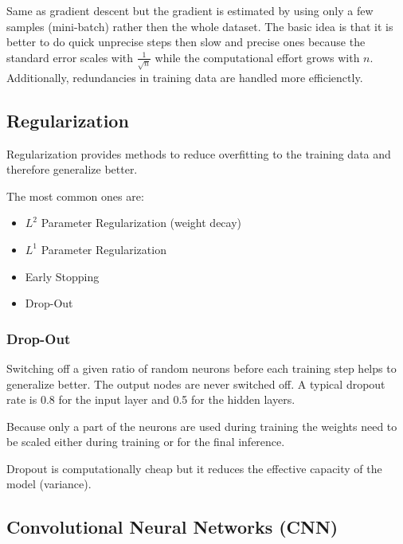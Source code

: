 Same as gradient descent but the gradient is estimated by using only a few samples (mini-batch) rather then the whole dataset.
The basic idea is that it is better to do quick unprecise steps then slow and precise ones because the standard error scales with $\frac{1}{\sqrt{n}}$ while the computational effort grows with $n$.
Additionally, redundancies in training data are handled more efficienctly.

\subsection{Regularization}

Regularization provides methods to reduce overfitting to the training data and therefore generalize better.

The most common ones are:
\begin{itemize}
    \item $L^2$ Parameter Regularization (weight decay)
    \item $L^1$ Parameter Regularization
    \item Early Stopping
    \item Drop-Out
\end{itemize}

\subsubsection{Drop-Out}

Switching off a given ratio of random neurons before each training step helps to generalize better. The output nodes are never switched off. A typical dropout rate is 0.8 for the input layer and 0.5 for the hidden layers.

\newpar{}

Because only a part of the neurons are used during training the weights need to be scaled either during training or for the final inference.


\newpar{}
Dropout is computationally cheap but it reduces the effective capacity of the model (variance).

\subsection{Convolutional Neural Networks (CNN)}

